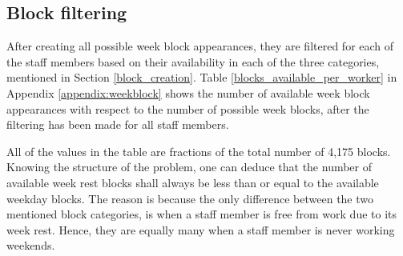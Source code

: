 \subsection{Block filtering}
After creating all possible week block appearances, they are filtered for each of the staff members based on their availability in each of the three categories, mentioned in Section \ref{block_creation}. Table \ref{blocks_available_per_worker} in Appendix \ref{appendix:weekblock} shows the number of available week block appearances with respect to the number of possible week blocks, after the filtering has been made for all staff members.


All of the values in the table are fractions of the total number of 4,175 blocks. Knowing the structure of the problem, one can deduce that the number of available week rest blocks shall always be less than or equal to the available weekday blocks. The reason is because the only difference between the two mentioned block categories, is when a staff member is free from work due to its week rest. Hence, they are equally many when a staff member is never working weekends.
